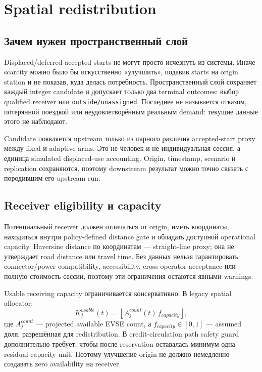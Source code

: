 \documentclass[11pt,a4paper]{article}
\newcommand{\code}[1]{\texttt{#1}}
\begin{document}
\section{Spatial redistribution}
\subsection{Зачем нужен пространственный слой}
Displaced/deferred accepted starts не могут просто исчезнуть из системы. Иначе scarcity можно было бы искусственно «улучшить», подавив starts на origin station и не показав, куда делась потребность. Пространственный слой сохраняет каждый integer candidate и допускает только два terminal outcomes: выбор qualified receiver или \code{outside/unassigned}. Последнее не называется отказом, потерянной поездкой или неудовлетворённым реальным demand: текущие данные этого не наблюдают.

Candidate появляется upstream только из парного различия accepted-start proxy между fixed и adaptive arms. Это не человек и не индивидуальная сессия, а единица simulated displaced-use accounting. Origin, timestamp, scenario и replication сохраняются, поэтому downstream результат можно точно связать с породившим его upstream run.

\subsection{Receiver eligibility и capacity}
Потенциальный receiver должен отличаться от origin, иметь координаты, находиться внутри policy-defined distance gate и обладать доступной operational capacity. Haversine distance по координатам --- straight-line proxy; она не утверждает road distance или travel time. Без данных нельзя гарантировать connector/power compatibility, accessibility, cross-operator acceptance или полную стоимость сессии, поэтому эти ограничения остаются явными warnings.

Usable receiving capacity ограничивается консервативно. В legacy spatial allocator:
\[
K_j^{usable}(t)=\left\lfloor A^{count}_j(t)\,f_{capacity}\right\rfloor,
\]
где $A^{count}_j$ --- projected available EVSE count, а $f_{capacity}\in[0,1]$ --- assumed доля, разрешённая для redistribution. В credit-circulation path safety guard дополнительно требует, чтобы после reservation оставалась минимум одна residual capacity unit. Поэтому улучшение origin не должно немедленно создавать zero availability на receiver.
\end{document}
